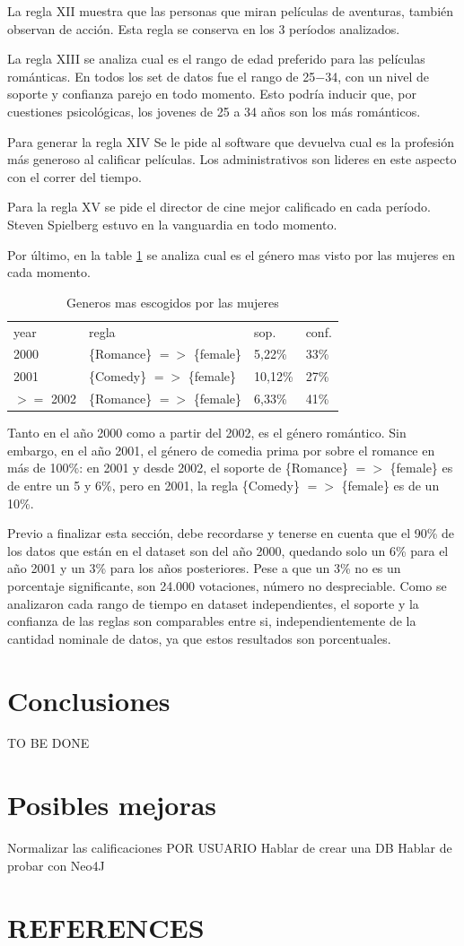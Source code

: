 \documentclass[journal]{IEEEtran}
\begin{document}
La regla XII muestra que las personas que miran películas de aventuras, también
observan de acción. Esta regla se conserva en los 3 períodos analizados.

La regla XIII se analiza cual es el rango de edad preferido para las películas
románticas. En todos los set de datos fue el rango de 25$-$34, con un nivel
de soporte y confianza parejo en todo momento. Esto podría inducir que, 
por cuestiones psicológicas, los jovenes de 25 a 34 años son los más 
románticos.

Para generar la regla XIV Se le pide al software que devuelva cual es la profesión
más generoso al calificar películas. Los administrativos son lideres en este
aspecto con el correr del tiempo.

Para la regla XV se pide el director de cine mejor calificado en cada período.
Steven Spielberg estuvo en la vanguardia en todo momento.

Por último, en la table \ref{genre_female} se analiza cual 
es el género mas visto por las mujeres en cada momento.

\begin{table}[ht!]
\caption{Generos mas escogidos por las mujeres}
\label{genre_female}
\centering
\begin{tabular}{l l l l }
year & regla & sop. & conf. \\
2000 & \{Romance\} $=$$>$ \{female\} & 5,22\% & 33\%  \\
2001 & \{Comedy\} $=$$>$ \{female\} & 10,12\% & 27\%  \\
$>$$=$ 2002 & \{Romance\} $=$$>$ \{female\} & 6,33\% & 41\%  \\
\end{tabular}
\end{table}

Tanto en el año 2000 como a partir del 2002, es el género romántico. Sin embargo, 
en el año 2001, el género de comedia prima por sobre el romance en más de 100\%:
en 2001 y desde 2002, el soporte de \{Romance\} $=$$>$ \{female\} es de entre
un 5 y 6\%, pero en 2001, la regla \{Comedy\} $=$$>$ \{female\} es de un 10\%.

Previo a finalizar esta sección, debe recordarse y tenerse en cuenta que 
 el 90\% de los datos que están en el dataset son del año 2000, quedando solo un 6\%
para el año 2001 y un 3\% para los años posteriores. Pese a que un  3\% 
no es un porcentaje significante, son 24.000 votaciones, número no despreciable.
Como se analizaron cada rango de tiempo en dataset independientes, el soporte
y la confianza de las reglas son comparables entre si, independientemente de la 
cantidad nominale de datos, ya que estos resultados son porcentuales.

\section{Conclusiones}
TO BE DONE

\section{Posibles mejoras}
Normalizar las calificaciones POR USUARIO
Hablar de crear una DB
Hablar de probar con Neo4J

\section*{REFERENCES}
\end{document}
